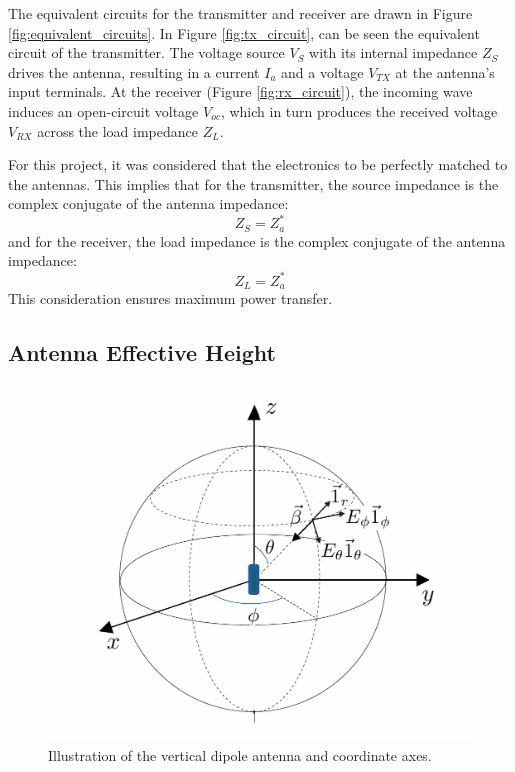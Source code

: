 The equivalent circuits for the transmitter and receiver are drawn in Figure \ref{fig:equivalent_circuits}. In Figure \ref{fig:tx_circuit}, can be seen the equivalent circuit of the transmitter. The voltage source $V_S$ with its internal impedance $Z_S$ drives the antenna, resulting in a current $I_a$ and a voltage $V_{TX}$ at the antenna's input terminals. At the receiver (Figure \ref{fig:rx_circuit}), the incoming wave induces an open-circuit voltage $V_{oc}$, which in turn produces the received voltage $V_{RX}$ across the load impedance $Z_L$.

For this project, it was considered that the electronics to be perfectly matched to the antennas. This implies that for the transmitter, the source impedance is the complex conjugate of the antenna impedance:
\begin{equation}
    Z_S = Z_a^*
\end{equation}
\vspace{0.5em}
and for the receiver, the load impedance is the complex conjugate of the antenna impedance:
\begin{equation}
    Z_L = Z_a^*
\end{equation}
\vspace{0.5em}
This consideration ensures maximum power transfer.

\subsection{Antenna Effective Height}
\begin{figure}[H]
    \centering
    \includegraphics[width=0.5\linewidth]{content/4-images/axes.png}
    \caption{Illustration of the vertical dipole antenna and coordinate axes.}
    \label{fig:axes}
\end{figure}

